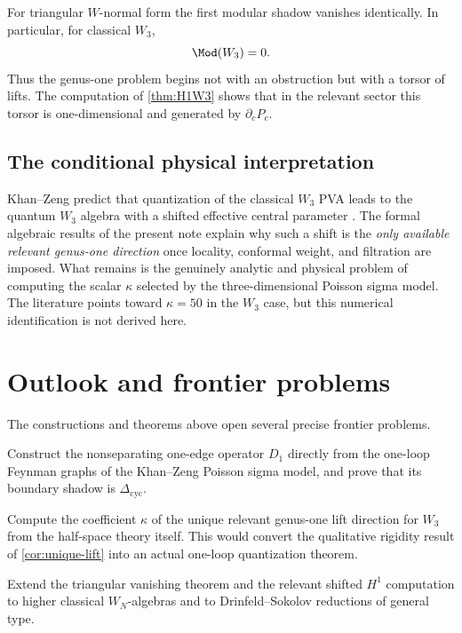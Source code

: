 For triangular $W$-normal form the first modular shadow vanishes identically. In particular,
for classical $W_3$,
\[
\Mod(W_3)=0.
\]
Thus the genus-one problem begins not with an obstruction but with a torsor of lifts. The
computation of \cref{thm:H1W3} shows that in the relevant sector this torsor is one-dimensional
and generated by $\partial_cP_c$.

\subsection{The conditional physical interpretation}

Khan--Zeng predict that quantization of the classical $W_3$ PVA leads to the quantum $W_3$
algebra with a shifted effective central parameter \cite{KZ25}. The formal algebraic
results of the present note explain why such a shift is the \emph{only available relevant
genus-one direction} once locality, conformal weight, and filtration are imposed. What
remains is the genuinely analytic and physical problem of computing the scalar $\kappa$
selected by the three-dimensional Poisson sigma model. The literature points toward
$\kappa=50$ in the $W_3$ case, but this numerical identification is not derived here.

\section{Outlook and frontier problems}

The constructions and theorems above open several precise frontier problems.

\begin{question}
Construct the nonseparating one-edge operator $D_1$ directly from the one-loop Feynman
graphs of the Khan--Zeng Poisson sigma model, and prove that its boundary shadow is
$\Delta_{\mathrm{cyc}}$.
\end{question}

\begin{question}
Compute the coefficient $\kappa$ of the unique relevant genus-one lift direction for
$W_3$ from the half-space theory itself. This would convert the qualitative rigidity
result of \cref{cor:unique-lift} into an actual one-loop quantization theorem.
\end{question}

\begin{question}[Beyond $W_3$]
Extend the triangular vanishing theorem and the relevant shifted $H^1$ computation to
higher classical $W_N$-algebras and to Drinfeld--Sokolov reductions of general type.
\end{question}

